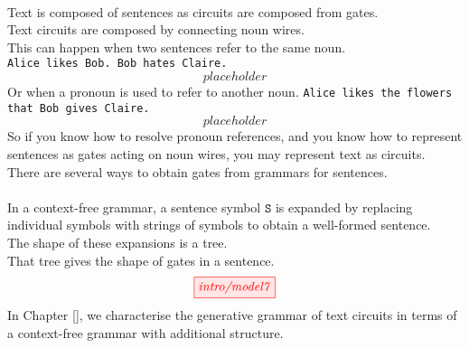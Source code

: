 \begin{fullwidth}
\begin{centering}
\\
Text is composed of sentences as circuits are composed from gates.\\
Text circuits are composed by connecting noun wires.\\
This can happen when two sentences refer to the same noun.\\
\texttt{Alice likes Bob. Bob hates Claire.}\\
\[placeholder\]
Or when a pronoun is used to refer to another noun.
\texttt{Alice likes the flowers that Bob gives Claire.}
\[placeholder\]
So if you know how to resolve pronoun references, and you know how to represent sentences as gates acting on noun wires, you may represent text as circuits.\\
There are several ways to obtain gates from grammars for sentences.\\

\\
In a context-free grammar, a sentence symbol $\texttt{S}$ is expanded by replacing individual symbols with strings of symbols to obtain a well-formed sentence.\\
The shape of these expansions is a tree.\\
That tree gives the shape of gates in a sentence.\\
\[\tikzfig{intro/model7}\]
In Chapter \ref{}, we characterise the generative grammar of text circuits in terms of a context-free grammar with additional structure.


\end{centering}
\end{fullwidth}
